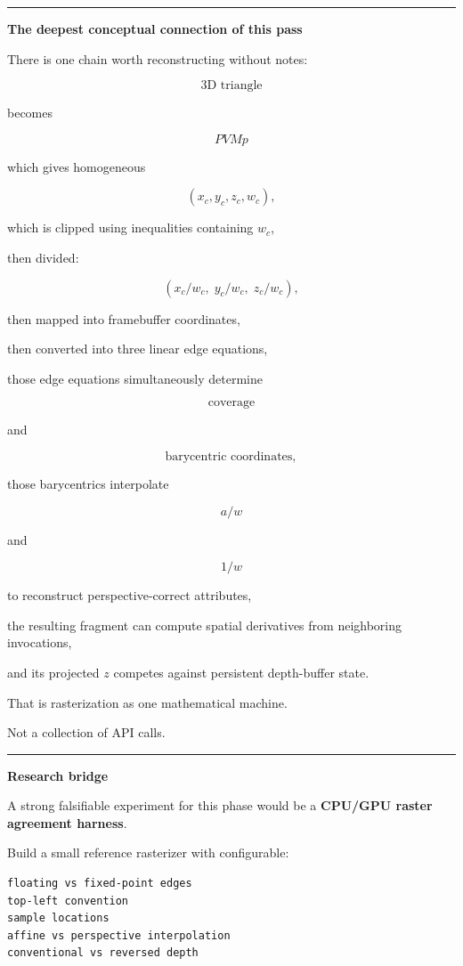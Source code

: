 \begin{center}\rule{0.5\linewidth}{0.5pt}\end{center}

\textbf{The deepest conceptual connection of this pass}

There is one chain worth reconstructing without notes:

\[
\boxed{
\text{3D triangle}
}
\]

becomes

\[
\boxed{
PVMp
}
\]

which gives homogeneous

\[
(x_c,y_c,z_c,w_c),
\]

which is clipped using inequalities containing \(w_c\),

then divided:

\[
(x_c/w_c,\;y_c/w_c,\;z_c/w_c),
\]

then mapped into framebuffer coordinates,

then converted into three linear edge equations,

those edge equations simultaneously determine

\[
\text{coverage}
\]

and

\[
\text{barycentric coordinates},
\]

those barycentrics interpolate

\[
a/w
\]

and

\[
1/w
\]

to reconstruct perspective-correct attributes,

the resulting fragment can compute spatial derivatives from neighboring invocations,

and its projected \(z\) competes against persistent depth-buffer state.

That is rasterization as one mathematical machine.

Not a collection of API calls.

\begin{center}\rule{0.5\linewidth}{0.5pt}\end{center}

\textbf{Research bridge}

A strong falsifiable experiment for this phase would be a \textbf{CPU/GPU raster agreement harness}.

Build a small reference rasterizer with configurable:

\begin{verbatim}
floating vs fixed-point edges
top-left convention
sample locations
affine vs perspective interpolation
conventional vs reversed depth
\end{verbatim}

